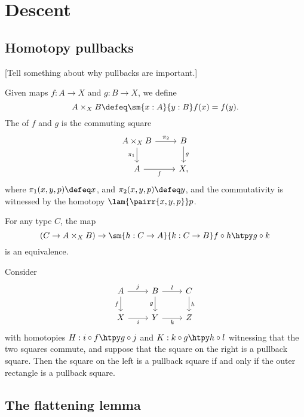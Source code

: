 \chapter{Descent}

\section{Homotopy pullbacks}
[Tell something about why pullbacks are important.]
\begin{defn}
Given maps $f:A\to X$ and $g:B\to X$, we define \[A\times_X B\defeq \sm{x:A}{y:B}f(x)=f(y).\] The  of $f$ and $g$ is the commuting square
\begin{equation*}
\begin{tikzcd}
A\times_X B \arrow[r,"\pi_2"] \arrow[d,swap,"\pi_1"] & B \arrow[d,"g"] \\
A \arrow[r,swap,"f"] & X,
\end{tikzcd}
\end{equation*}
where $\pi_1(x,y,p)\defeq x$, and $\pi_2(x,y,p)\defeq y$, and the commutativity is witnessed by the homotopy $\lam{\pairr{x,y,p}}p$. 
\end{defn}

\begin{thm}
For any type $C$, the map
\begin{equation*}
(C\to A\times_X B)\to \sm{h:C\to A}{k:C\to B}f\circ h\htpy g\circ k
\end{equation*}
is an equivalence.
\end{thm}

\begin{lem}\label{lem:pb_pasting}
Consider 
\begin{equation*}
\begin{tikzcd}
A \arrow[d,swap,"f"] \arrow[r,"j"] & B \arrow[d,swap,"g"] \arrow[r,"l"] & C \arrow[d,"h"] \\
X \arrow[r,swap,"i"] & Y \arrow[r,swap,"k"] & Z
\end{tikzcd}
\end{equation*}
with homotopies $H:i\circ f\htpy g\circ j$ and $K:k\circ g\htpy h\circ l$ witnessing that the two squares commute, and suppose that the square on the right is a pullback square. Then the square on the left is a pullback square if and only if the outer rectangle is a pullback square.
\end{lem}

\section{The flattening lemma}

